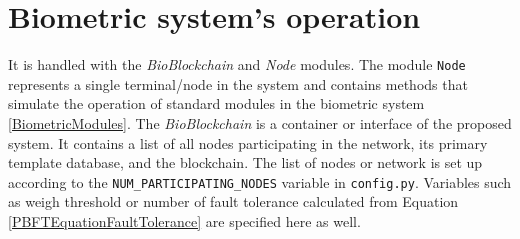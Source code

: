 \section{Biometric system's operation}
It is handled with the \emph{BioBlockchain} and \emph{Node} modules. The module \texttt{Node} represents a single terminal/node in the system and contains methods that simulate the operation of standard modules in the biometric system \ref{BiometricModules}. 
The \emph{BioBlockchain} is a container or interface of the proposed system. It contains a list of all nodes participating in the network, its primary template database, and the blockchain. The list of nodes or network is set up according to the \texttt{NUM\_PARTICIPATING\_NODES} variable in \texttt{config.py}. Variables such as weigh threshold or number of fault tolerance calculated from Equation \ref{PBFTEquationFaultTolerance} are specified here as well. 

